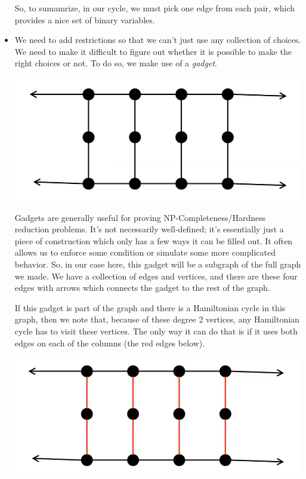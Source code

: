 \documentclass[letterpaper]{article}
\begin{document}
\begin{itemize}
    \bigskip 

    So, to sumamrize, in our cycle, we must pick one edge from each pair, which provides a nice set of binary variables. 

    \item We need to add restrictions so that we can't just use any collection of choices. We need to make it difficult to figure out whether it is possible to make the right choices or not. To do so, we make use of a \emph{gadget}. 
    \begin{center}
        \includegraphics[scale=0.35]{../assets/zoe_ham_3.png}
    \end{center}
    Gadgets are generally useful for proving NP-Completeness/Hardness reduction problems. It's not necessarily well-defined; it's essentially just a piece of construction which only has a few ways it can be filled out. It often allows us to enforce some condition or simulate some more complicated behavior. So, in our case here, this gadget will be a subgraph of the full graph we made. We have a collection of edges and vertices, and there are these four edges with arrows which connects the gadget to the rest of the graph.
    
    \bigskip 

    If this gadget is part of the graph and there is a Hamiltonian cycle in this graph, then we note that, because of these degree 2 vertices, any Hamiltonian cycle has to visit these vertices. The only way it can do that is if it uses both edges on each of the columns (the red edges below).
    \begin{center}
        \includegraphics[scale=0.35]{../assets/zoe_ham_4.png}
    \end{center}


\end{itemize}
\end{document}
